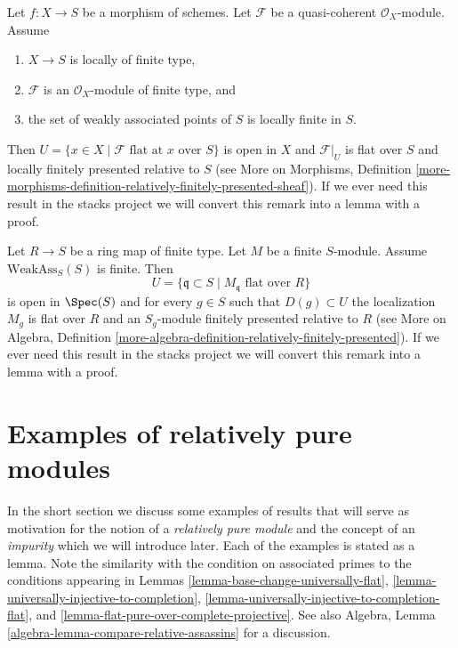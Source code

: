 \begin{remark}
\label{remark-finite-type-flat}
Let $f : X \to S$ be a morphism of schemes.
Let $\mathcal{F}$ be a quasi-coherent $\mathcal{O}_X$-module.
Assume
\begin{enumerate}
\item $X \to S$ is locally of finite type,
\item $\mathcal{F}$ is an $\mathcal{O}_X$-module of finite type, and
\item the set of weakly associated points of $S$ is locally finite in $S$.
\end{enumerate}
Then $U = \{x \in X \mid \mathcal{F}\text{ flat at }x\text{ over }S\}$
is open in $X$ and $\mathcal{F}|_U$ is flat over $S$ and locally
finitely presented relative to $S$ (see
More on Morphisms, Definition
\ref{more-morphisms-definition-relatively-finitely-presented-sheaf}).
If we ever need this result in the stacks project we will convert
this remark into a lemma with a proof.
\end{remark}

\begin{remark}
\label{remark-finite-type-flat-algebra}
Let $R \to S$ be a ring map of finite type.
Let $M$ be a finite $S$-module.
Assume $\text{WeakAss}_S(S)$ is finite.
Then
$$
U = \{\mathfrak q \subset S \mid M_{\mathfrak q}\text{ flat over }R\}
$$
is open in $\Spec(S)$ and for every $g \in S$ such that
$D(g) \subset U$ the localization $M_g$ is flat over $R$ and
an $S_g$-module finitely presented relative to $R$ (see
More on Algebra, Definition
\ref{more-algebra-definition-relatively-finitely-presented}).
If we ever need this result in the stacks project we will convert
this remark into a lemma with a proof.
\end{remark}









\section{Examples of relatively pure modules}
\label{section-examples-pure-modules}

\noindent
In the short section we discuss some examples of results that will serve
as motivation for the notion of a {\it relatively pure module} and the
concept of an {\it impurity} which we will introduce later. Each of the
examples is stated as a lemma. Note the similarity with the condition on
associated primes to the conditions appearing in
Lemmas \ref{lemma-base-change-universally-flat},
\ref{lemma-universally-injective-to-completion},
\ref{lemma-universally-injective-to-completion-flat}, and
\ref{lemma-flat-pure-over-complete-projective}.
See also
Algebra, Lemma \ref{algebra-lemma-compare-relative-assassins}
for a discussion.

